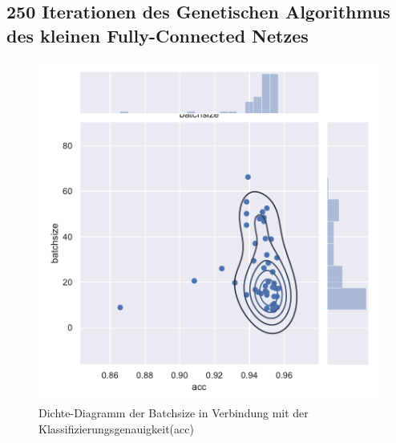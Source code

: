 \subsection{250 Iterationen des Genetischen Algorithmus des kleinen Fully-Connected Netzes}
\begin{figure}[H]
  \centering  
  \includegraphics[scale=0.5]{anhang/GA_250_mnist_digits_True_small_jointplot_batchsize.pdf}
  \caption{Dichte-Diagramm der Batchsize in Verbindung mit der Klassifizierungsgenauigkeit(acc)}
  
\end{figure}

